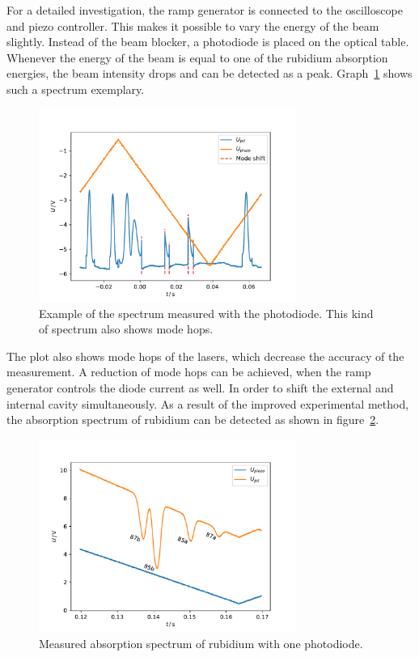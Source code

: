 For a detailed investigation, the ramp generator is connected to the oscilloscope
and piezo controller. This makes it possible to vary the energy of the beam slightly.
Instead of the beam blocker, a photodiode is placed on the
optical table. Whenever the energy of the beam is equal to one of the rubidium
absorption energies, the beam intensity drops and can be detected as a peak.
Graph~\ref{fig: spectrum} shows such a spectrum exemplary.
\begin{figure}
  \centering
  \includegraphics[width = 0.75\textwidth]{../analysis/plots/modeshift.pdf}
  \caption{Example of the spectrum measured with the photodiode. This kind of spectrum also
          shows mode hops.}
  \label{fig: spectrum}
\end{figure}
The plot also shows mode hops of the lasers, which decrease the accuracy of the
measurement. A reduction of mode hops can be achieved, when the ramp generator
controls the diode current as well. In order to shift the external and internal cavity
simultaneously. As a result of the improved experimental method, the absorption
spectrum of rubidium can be detected as shown in figure~\ref{fig: spectrum_measured}.
\begin{figure}
  \centering
  \includegraphics[width = 0.75\textwidth]{../analysis/plots/spectrum_angled.pdf}
  \caption{Measured absorption spectrum of rubidium with one photodiode.}
  \label{fig: spectrum_measured}
\end{figure}
